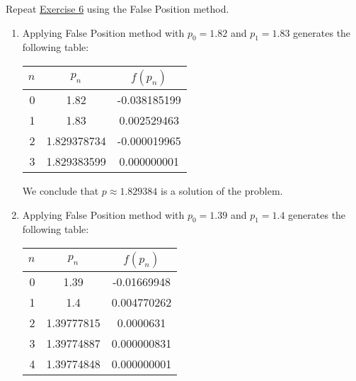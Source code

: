 \documentclass[../../../../Assignments]{subfiles}
\begin{document}
\begin{exercise}
    Repeat \hyperref[exer:2.3.6]{Exercise 6} using the False Position method.
\end{exercise}

\begin{solution}
    \begin{enumerate}[label = \alph*)]
        \item Applying False Position method with \(p_0 = \num{1.82}\) and \(p_1
            = \num{1.83}\) generates the following table:

            \begin{table}[H]
                \centering
                \begin{tabular}{r S[table-format=1.9] S[table-format=-1.9]}
                    \toprule
                    \(n\)  &   {\(p_n\)}   &  {\(f(p_n)\)}  \\
                      &  1.82         &  -0.038185199  \\
                        1  &  1.83         &   0.002529463  \\
                        2  &  1.829378734  &  -0.000019965  \\
                        3  &  1.829383599  &   0.000000001  \\
                    \bottomrule
                \end{tabular}
            \end{table}

            We conclude that \(p \approx \num{1.829384}\) is a solution of the
            problem.

        \item Applying False Position method with \(p_0 = \num{1.39}\) and \(p_1
            = \num{1.4}\) generates the following table:

            \begin{table}[H]
                \centering
                \begin{tabular}{r S[table-format=1.8] S[table-format=-1.9]}
                    \toprule
                    \(n\)  &   {\(p_n\)}   &  {\(f(p_n)\)}  \\
                      &  1.39         &  -0.01669948   \\
                        1  &  1.4          &   0.004770262  \\
                        2  &  1.39777815   &   0.0000631    \\
                        3  &  1.39774887   &   0.000000831  \\
                        4  &  1.39774848   &   0.000000001  \\
                    \bottomrule
                \end{tabular}
            \end{table}


\end{enumerate}
\end{solution}
\end{document}
